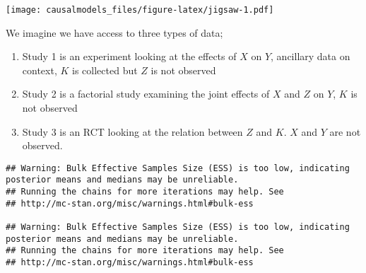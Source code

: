 \documentclass[
  12pt,
]{book}
\newenvironment{Shaded}{\begin{snugshade}}{\end{snugshade}}
\newcommand{\DataTypeTok}[1]{\textcolor[rgb]{0.13,0.29,0.53}{#1}}
\newcommand{\DecValTok}[1]{\textcolor[rgb]{0.00,0.00,0.81}{#1}}
\newcommand{\KeywordTok}[1]{\textcolor[rgb]{0.13,0.29,0.53}{\textbf{#1}}}
\newcommand{\NormalTok}[1]{#1}
\newcommand{\OperatorTok}[1]{\textcolor[rgb]{0.81,0.36,0.00}{\textbf{#1}}}
\newcommand{\OtherTok}[1]{\textcolor[rgb]{0.56,0.35,0.01}{#1}}
\newcommand{\StringTok}[1]{\textcolor[rgb]{0.31,0.60,0.02}{#1}}
\providecommand{\tightlist}{%
  \setlength{\itemsep}{0pt}\setlength{\parskip}{0pt}}
\begin{document}
\texttt{[image: causalmodels\_files/figure-latex/jigsaw-1.pdf]}

We imagine we have access to three types of data;

\begin{enumerate}
\def\labelenumi{\arabic{enumi}.}
\tightlist
\item
  Study 1 is an experiment looking at the effects of \(X\) on \(Y\), ancillary data on context, \(K\) is collected but \(Z\) is not observed
\item
  Study 2 is a factorial study examining the joint effects of \(X\) and \(Z\) on \(Y\), \(K\) is not observed
\item
  Study 3 is an RCT looking at the relation between \(Z\) and \(K\). \(X\) and \(Y\) are not observed.
\end{enumerate}

\begin{Shaded}
\end{Shaded}

\begin{verbatim}
## Warning: Bulk Effective Samples Size (ESS) is too low, indicating posterior means and medians may be unreliable.
## Running the chains for more iterations may help. See
## http://mc-stan.org/misc/warnings.html#bulk-ess

## Warning: Bulk Effective Samples Size (ESS) is too low, indicating posterior means and medians may be unreliable.
## Running the chains for more iterations may help. See
## http://mc-stan.org/misc/warnings.html#bulk-ess
\end{verbatim}
\end{document}
